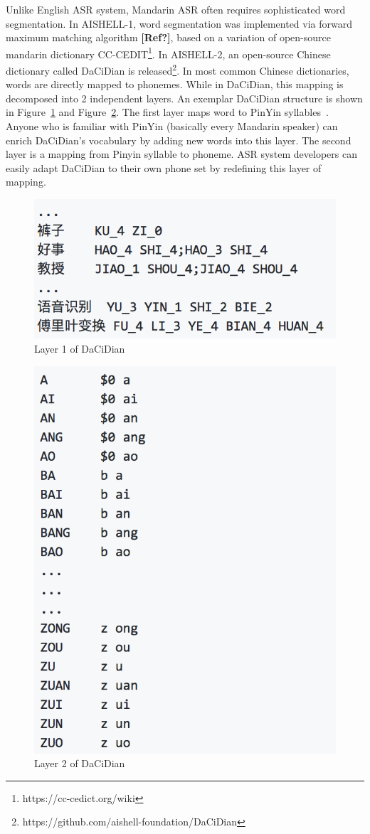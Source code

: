\documentclass[a4paper]{article}
\begin{document}
Unlike English ASR system, Mandarin ASR often requires sophisticated word segmentation. 
In AISHELL-1, word segmentation was implemented via forward
maximum matching algorithm \textbf{[Ref?]}, based on a variation of open-source mandarin
dictionary CC-CEDIT\footnote{https://cc-cedict.org/wiki}. In AISHELL-2, an
open-source Chinese dictionary called DaCiDian is
released\footnote{https://github.com/aishell-foundation/DaCiDian}. In most
common Chinese dictionaries, words are directly mapped to phonemes. While in
DaCiDian, this mapping is decomposed into 2 independent layers. An exemplar
DaCiDian structure is shown in Figure~\ref{fig:lex1} and Figure~\ref{fig:lex2}. The first layer maps word to PinYin syllables~\cite{pinyin}. Anyone who is
  familiar with PinYin (basically every Mandarin speaker) can enrich DaCiDian's
  vocabulary by adding new words into this layer. The second layer is a mapping from Pinyin syllable to phoneme. ASR system
  developers can easily adapt DaCiDian to their own phone set by redefining this
  layer of mapping.

\begin{figure}[t]
  \centering
  \includegraphics[width=0.8\linewidth]{dacidianl1.png}
  \caption{Layer 1 of DaCiDian}
  \label{fig:lex1}
\end{figure}
\begin{figure}[t]
  \centering
  \includegraphics[width=0.8\linewidth]{dacidianl2.png}
  \caption{Layer 2 of DaCiDian}
  \label{fig:lex2}
\end{figure}
\end{document}
